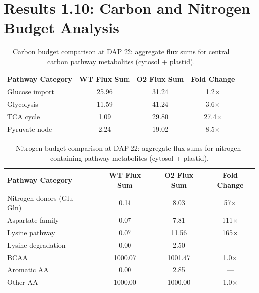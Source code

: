 \documentclass[11pt,letterpaper]{article}
\begin{document}
\section{Results 1.10: Carbon and Nitrogen Budget Analysis}

\begin{table}[H]
\centering
\caption{Carbon budget comparison at DAP 22: aggregate flux sums for central carbon pathway metabolites (cytosol + plastid).}
\label{stab:carbon_budget}
\begin{tabular}{lccc}
\toprule
Pathway Category & WT Flux Sum & O2 Flux Sum & Fold Change \\
\midrule
Glucose import    & 25.96 & 31.24 & 1.2$\times$ \\
Glycolysis        & 11.59 & 41.24 & 3.6$\times$ \\
TCA cycle         & 1.09  & 29.80 & 27.4$\times$ \\
Pyruvate node     & 2.24  & 19.02 & 8.5$\times$ \\
\bottomrule
\end{tabular}
\end{table}

\clearpage

\begin{table}[H]
\centering
\caption{Nitrogen budget comparison at DAP 22: aggregate flux sums for nitrogen-containing pathway metabolites (cytosol + plastid).}
\label{stab:nitrogen_budget}
\begin{tabular}{lccc}
\toprule
Pathway Category & WT Flux Sum & O2 Flux Sum & Fold Change \\
\midrule
Nitrogen donors (Glu + Gln)  & 0.14  & 8.03   & 57$\times$ \\
Aspartate family             & 0.07  & 7.81   & 111$\times$ \\
Lysine pathway               & 0.07  & 11.56  & 165$\times$ \\
Lysine degradation           & 0.00  & 2.50   & --- \\
BCAA                         & 1000.07 & 1001.47 & 1.0$\times$ \\
Aromatic AA                  & 0.00  & 2.85   & --- \\
Other AA                     & 1000.00 & 1000.00 & 1.0$\times$ \\
\bottomrule
\end{tabular}
\end{table}

\clearpage
\end{document}
